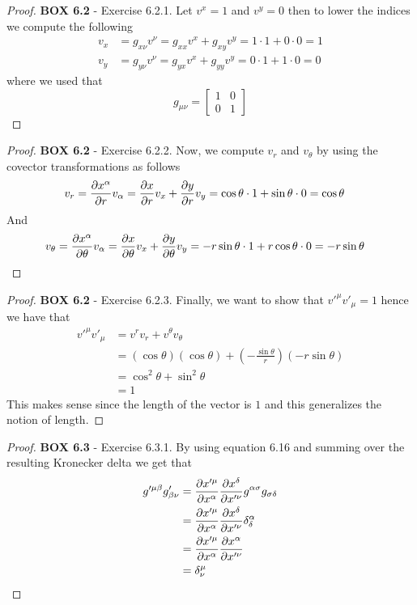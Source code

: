 \documentclass[11pt]{article}
\theoremstyle{definition}
\begin{document}
\begin{proof}{\textbf{BOX 6.2} - Exercise 6.2.1.}
    Let $v^x = 1$ and $v^y = 0$ then to lower the indices we compute
    the following
    \begin{align*}
        v_x &= g_{x\nu} v^{\nu}
            = g_{xx}v^x + g_{xy}v^y = 1\cdot 1 + 0 \cdot 0 = 1\\
        v_y &= g_{y\nu} v^{\nu}
        = g_{yx}v^x + g_{yy}v^y = 0\cdot 1 + 1 \cdot 0 = 0
    \end{align*}
    where we used that
    $$g_{\mu\nu} = \begin{bmatrix}
        1 & 0\\ 0& 1
    \end{bmatrix}$$
\end{proof}
\begin{proof}{\textbf{BOX 6.2} - Exercise 6.2.2.}
    Now, we compute $v_r$ and $v_\theta$ by using the covector transformations
    as follows
    \begin{align*}
        v_r &= \partialderivative{x^\alpha}{r} v_\alpha
            = \partialderivative{x}{r}v_x + \partialderivative{y}{r}v_y
            = \cos\theta\cdot 1 + \sin\theta\cdot 0
            = \cos\theta
    \end{align*}
    And
    \begin{align*}
        v_\theta &= \partialderivative{x^\alpha}{\theta} v_\alpha
            = \partialderivative{x}{\theta}v_x + \partialderivative{y}{\theta}v_y
            = -r\sin\theta\cdot 1 + r\cos\theta\cdot 0
            = -r\sin\theta
    \end{align*}
\end{proof}
\begin{proof}{\textbf{BOX 6.2} - Exercise 6.2.3.}
    Finally, we want to show that $v'^\mu v'_\mu = 1$ hence we have that
    \begin{align*}
        v'^\mu v'_\mu &= v^r v_r + v^\theta v_\theta\\
            &= (\cos\theta)(\cos\theta)
            + \left(-\frac{\sin\theta}{r}\right)(-r\sin\theta)\\
            &= \cos^2\theta + \sin^2\theta\\
            &= 1
    \end{align*}
    This makes sense since the length of the vector is $1$ and this generalizes
    the notion of length.
\end{proof}
\begin{proof}{\textbf{BOX 6.3} - Exercise 6.3.1.}
    By using equation 6.16 and summing over the resulting Kronecker delta
    we get that
    \begin{align*}
        g'^{\mu\beta}g'_{\beta\nu} &= \partialderivative{x'^\mu}{x^\alpha}
        \partialderivative{x^\delta}{x'^\nu} g^{\alpha\sigma}g_{\sigma\delta}\\
        &= \partialderivative{x'^\mu}{x^\alpha}
        \partialderivative{x^\delta}{x'^\nu} \delta^{\alpha}_{\delta}\\
        &= \partialderivative{x'^\mu}{x^\alpha}\partialderivative{x^\alpha}{x'^\nu}\\
        &= \delta^{\mu}_\nu
    \end{align*}
\end{proof}
\end{document}
